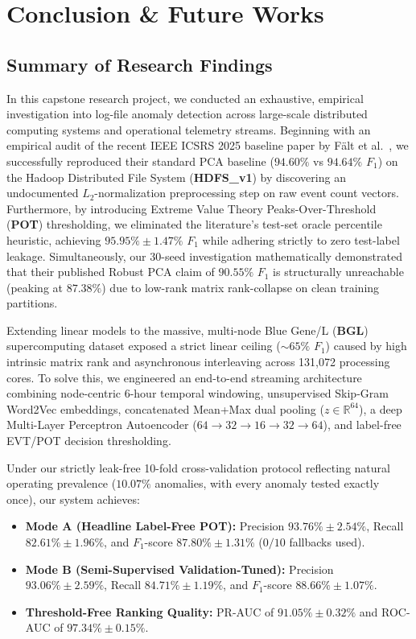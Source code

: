 \chapter{Conclusion \& Future Works}
\label{ch:conclusion}

\section{Summary of Research Findings}
\label{sec:conclusion_summary}
In this capstone research project, we conducted an exhaustive, empirical investigation into log-file anomaly detection across large-scale distributed computing systems and operational telemetry streams. Beginning with an empirical audit of the recent IEEE ICSRS 2025 baseline paper by F{\"a}lt et al.~\cite{falt2025lightweight}, we successfully reproduced their standard PCA baseline ($94.60\%$ vs $94.64\%$ $F_1$) on the Hadoop Distributed File System (\textbf{HDFS\_v1}) by discovering an undocumented $L_2$-normalization preprocessing step on raw event count vectors. Furthermore, by introducing Extreme Value Theory Peaks-Over-Threshold (\textbf{POT}) thresholding, we eliminated the literature's test-set oracle percentile heuristic, achieving $95.95\% \pm 1.47\%$ $F_1$ while adhering strictly to zero test-label leakage. Simultaneously, our 30-seed investigation mathematically demonstrated that their published Robust PCA claim of $90.55\%$ $F_1$ is structurally unreachable (peaking at $87.38\%$) due to low-rank matrix rank-collapse on clean training partitions.

Extending linear models to the massive, multi-node Blue Gene/L (\textbf{BGL}) supercomputing dataset exposed a strict linear ceiling ($\sim 65\%$ $F_1$) caused by high intrinsic matrix rank and asynchronous interleaving across 131,072 processing cores. To solve this, we engineered an end-to-end streaming architecture combining node-centric 6-hour temporal windowing, unsupervised Skip-Gram Word2Vec embeddings, concatenated Mean+Max dual pooling ($z \in \mathbb{R}^{64}$), a deep Multi-Layer Perceptron Autoencoder ($64 \rightarrow 32 \rightarrow 16 \rightarrow 32 \rightarrow 64$), and label-free EVT/POT decision thresholding.

Under our strictly leak-free 10-fold cross-validation protocol reflecting natural operating prevalence ($10.07\%$ anomalies, with every anomaly tested exactly once), our system achieves:
\begin{itemize}
    \item \textbf{Mode A (Headline Label-Free POT):} Precision $93.76\% \pm 2.54\%$, Recall $82.61\% \pm 1.96\%$, and $F_1$-score $\mathbf{87.80\% \pm 1.31\%}$ ($0/10$ fallbacks used).
    \item \textbf{Mode B (Semi-Supervised Validation-Tuned):} Precision $93.06\% \pm 2.59\%$, Recall $84.71\% \pm 1.19\%$, and $F_1$-score $\mathbf{88.66\% \pm 1.07\%}$.
    \item \textbf{Threshold-Free Ranking Quality:} PR-AUC of $\mathbf{91.05\% \pm 0.32\%}$ and ROC-AUC of $\mathbf{97.34\% \pm 0.15\%}$.
\end{itemize}

